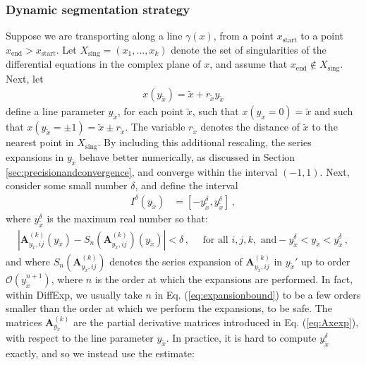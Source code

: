 \documentclass{article}
\begin{document}
\subsubsection{Dynamic segmentation strategy}
\label{sec:dynseg}
Suppose we are transporting along a line $\gamma(x)$, from a point $x_{\text{start}}$ to a point $x_{\text{end}} > x_{\text{start}}$. Let $X_{\text{sing}} = (x_1, \ldots, x_k)$ denote the set of singularities of the differential equations in the complex plane of $x$, and assume that $x_{\text{end}} \notin X_{\text{sing}}$. Next, let
\begin{align}
    x(y_{\tilde{x}}) = \tilde{x} + r_{\tilde{x}} y_{\tilde{x}}
\end{align}
define a line parameter $y_{\tilde{x}}$, for each point $\tilde{x}$, such that $x(y_{\tilde{x}} = 0) = \tilde{x}$ and such that $x(y_{\tilde{x}} = \pm 1) = \tilde{x} \pm r_{\tilde{x}}$. The variable $r_{\tilde{x}}$ denotes the distance of $\tilde{x}$ to the nearest point in $X_{\text{sing}}$. By including this additional rescaling, the series expansions in $y_{\tilde{x}}$ behave better numerically, as discussed in Section \ref{sec:precisionandconvergence}, and converge within the interval $(-1,1)$. Next, consider some small number $\delta$, and define the interval
\begin{align}
    \label{eq:intytildex}
    I^\delta(y_{\tilde{x}}) &= [-y^\delta_{\tilde{x}} , y^\delta_{\tilde{x}}]\,,
\end{align}
where $y_{\tilde{x}}^\delta$ is the maximum real number so that:
\begin{align}
    \label{eq:expansionbound}
    \left|\mathbf{A}_{y_{\tilde{x}},ij}^{(k)}(y_{\tilde{x}})-S_{n} \left(\mathbf{A}_{y_{\tilde{x}},ij}^{(k)}\right)(y_{\tilde{x}})\right|<\delta\,, \quad \text{ for all }i,j,k,   \text{ and} -y^\delta_{\tilde{x}} < y_{\tilde{x}} < y^\delta_{\tilde{x}}\,,
\end{align}
and where $S_{n} \left(\mathbf{A}_{y_{\tilde{x}},ij}^{(k)}\right)$ denotes the series expansion of $\mathbf{A}_{y_{\tilde{x}},ij}^{(k)}$ in $y_{\tilde{x}}'$ up to order $\mathcal{O}(y_{\tilde{x}}^{n+1})$, where $n$ is the order at which the expansions are performed. In fact, within DiffExp, we usually take $n$ in Eq. (\ref{eq:expansionbound}) to be a few orders smaller than the order at which we perform the expansions, to be safe. The matrices $\mathbf{A}_{y_{\tilde{x}}}^{(k)}$ are the partial derivative matrices introduced in Eq. (\ref{eq:Axexp}), with respect to the line parameter $y_{\tilde{x}}$. In practice, it is hard to compute $y^\delta_{\tilde{x}}$ exactly, and so we instead use the estimate:
\end{document}

